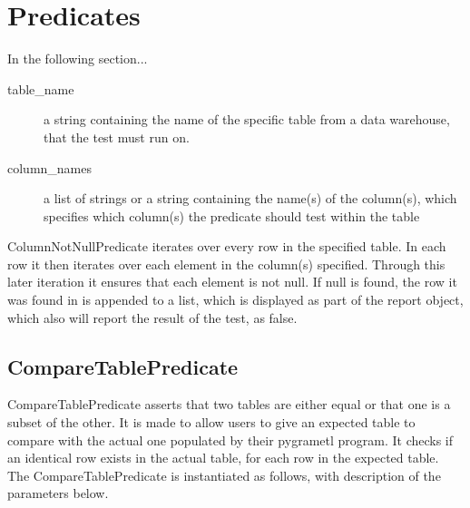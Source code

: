 \section{Predicates}
In the following section...











\begin{description}
\item [table\_name] a string containing the name of the specific table from a data warehouse, that the test must run on. 
\item [column\_names] a list of strings or a string containing the name(s) of the column(s), which specifies which column(s) the predicate should test within the table
\end{description}

ColumnNotNullPredicate iterates over every row in the specified table. In each row it then iterates over each element in the column(s) specified. Through this later iteration it ensures that each element is not null. If null is found, the row it was found in is appended to a list, which is displayed as part of the report object, which also will report the result of the test, as false.

\subsection{CompareTablePredicate}
CompareTablePredicate asserts that two tables are either equal or that one is a subset of the other. It is made to allow users to give an expected table to compare with the actual one populated by their pygrametl program. It checks if an identical row exists in the actual table, for each row in the expected table. The CompareTablePredicate is instantiated as follows, with description of the parameters below.


